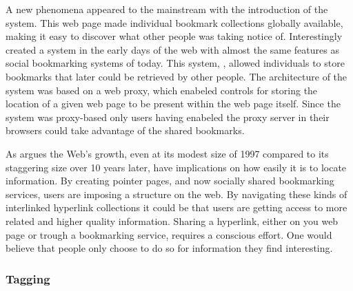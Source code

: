 A new phenomena appeared to the mainstream with the introduction of the
 system. This web page made individual
bookmark collections globally available, making it easy to discover what other
people was taking notice of. Interestingly \citet{keller97} created a system
in the early days of the web with almost the same features as social
bookmarking systems of today. This system, , allowed
individuals to store bookmarks that later could be retrieved by other people.
The architecture of the system was based on a web proxy, which enabeled
controls for storing the location of a given web page to be present within the
web page itself. Since the system was proxy-based only users having enabeled
the proxy server in their browsers could take advantage of the shared
bookmarks.


As \citet[]{dieberger97} argues the Web's growth, even at its modest
size of 1997 compared to its staggering size over 10 years later, have
implications on how easily it is to locate information. By creating pointer
pages, and now socially shared bookmarking services, users are imposing a
structure on the web. By navigating these kinds of interlinked hyperlink
collections it could be that users are getting access to more related and
higher quality information. Sharing a hyperlink, either on you web page or
trough a bookmarking service, requires a conscious effort. One would believe
that people only choose to do so for information they find interesting.

\subsubsection{Tagging}

